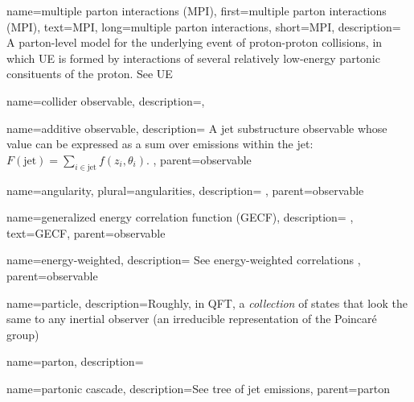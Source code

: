 {
  name=multiple parton interactions (MPI),
  first=multiple parton interactions (MPI),
  text=MPI,
  long=multiple parton interactions,
  short=MPI,
  description={
      A parton-level model for the underlying event of proton-proton collisions, in which UE is formed by interactions of several relatively low-energy partonic consituents of the proton.
      See UE
    }
}



{
    name=collider observable,
    description={},
}

    {
        name=additive observable,
        description={
            A jet substructure observable whose value can be expressed as a sum over emissions within the jet:
            \(F(\text{jet}) = \sum_{i \in \text{jet}} f(z_i, \theta_i)\).
        },
        parent=observable
    }


    {
        name=angularity,
        plural=angularities,
        description={
        },
        parent=observable
    }

    {
        name=generalized energy correlation function (GECF),
        description={
        },
        text=GECF,
        parent=observable
    }

    {
        name=energy-weighted,
        description={
            See energy-weighted correlations
        },
        parent=observable
    }



{
  name=particle,
  description={Roughly, in QFT, a \textit{collection} of states that look the same to any inertial observer (an irreducible representation of the Poincar\'e group)}
}


{
  name=parton,
  description={}
}

    {
      name=partonic cascade,
      description={See tree of jet emissions},
      parent=parton
    }

